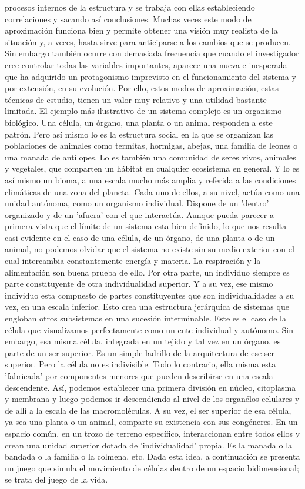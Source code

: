 \documentclass[12pt,a4paper]{book}
\begin{document}
	procesos internos de la estructura y se trabaja con ellas estableciendo correlaciones y sacando así conclusiones.
	Muchas veces este modo de aproximación funciona bien y permite obtener una visión muy realista de la
	situación y, a veces, hasta sirve para anticiparse a los cambios que se producen. Sin embargo también ocurre
	con demasiada frecuencia que cuando el investigador cree controlar todas las variables importantes, aparece
	una nueva e inesperada que ha adquirido un protagonismo imprevisto en el funcionamiento del sistema y por
	extensión, en su evolución. Por ello, estos modos de aproximación, estas técnicas de estudio, tienen un valor
	muy relativo y una utilidad bastante limitada.
	El ejemplo más ilustrativo de un sistema complejo es un organismo biológico. Una célula, un órgano, una
	planta o un animal responden a este patrón. Pero así mismo lo es la estructura social en la que se organizan
	las poblaciones de animales como termitas, hormigas, abejas, una familia de leones o una manada de antílopes.
	Lo es también una comunidad de seres vivos, animales y vegetales, que comparten un hábitat en cualquier
	ecosistema en general. Y lo es así mismo un bioma, a una escala mucho más amplia y referida a las condiciones
	climáticas de una zona del planeta. Cada uno de ellos, a su nivel, actúa como una unidad autónoma, como un
	organismo individual. Dispone de un 'dentro' organizado y de un 'afuera' con el que interactúa.
	Aunque pueda parecer a primera vista que el límite de un sistema esta bien definido, lo que nos resulta casi
	evidente en el caso de una célula, de un órgano, de una planta o de un animal, no podemos olvidar que el sistema
	no existe sin su medio exterior con el cual intercambia constantemente energía y materia. La respiración y la
	alimentación son buena prueba de ello.
	Por otra parte, un individuo siempre es parte constituyente de otra individualidad superior. Y a su vez,
	ese mismo individuo esta compuesto de partes constituyentes que son individualidades a su vez, en una
	escala inferior. Esto crea una estructura jerárquica de sistemas que engloban otros subsistemas en una sucesión
	interminable.
	Este es el caso de la célula que visualizamos perfectamente como un ente individual y autónomo. Sin embargo,
	esa misma célula, integrada en un tejido y tal vez en un órgano, es parte de un ser superior. Es un simple
	ladrillo de la arquitectura de ese ser superior. Pero la célula no es indivisible. Todo lo contrario, ella misma
	esta 'fabricada' por componentes menores que pueden describirse en una escala descendente. Así, podemos
	establecer una primera división en núcleo, citoplasma y membrana y luego podemos ir descendiendo al nivel de
	los organélos celulares y de allí a la escala de las macromoléculas.
	A su vez, el ser superior de esa célula, ya sea una planta o un animal, comparte su existencia con sus
	congéneres. En un espacio común, en un trozo de terreno específico, interaccionan entre todos ellos y crean una
	unidad superior dotada de 'individualidad' propia. Es la manada o la bandada o la familia o la colmena, etc.
	Dada esta idea, a continuación se presenta un juego que simula el movimiento de células dentro de un espacio
	bidimensional; se trata del juego de la vida.
\end{document}
